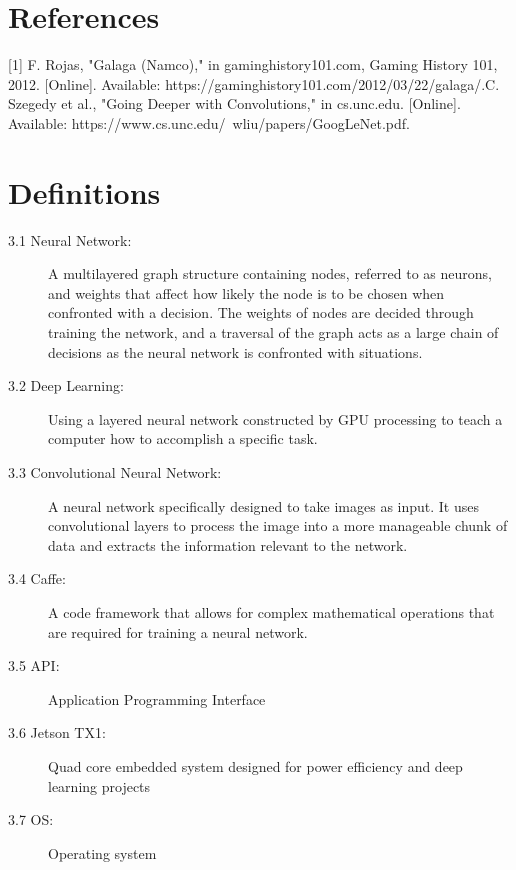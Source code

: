 \documentclass{scrreprt}
\begin{document}
\chapter{References}

[1] F. Rojas, "Galaga (Namco)," in gaminghistory101.com, Gaming History 101, 2012. [Online]. Available: https://gaminghistory101.com/2012/03/22/galaga/.\newline
[2] C. Szegedy et al., "Going Deeper with Convolutions," in cs.unc.edu. [Online]. Available: https://www.cs.unc.edu/~wliu/papers/GoogLeNet.pdf.\newline

\chapter{Definitions}
\begin{description}

  \item[3.1 Neural Network:] A multilayered graph structure containing nodes, referred to as neurons, and weights that affect how likely the node is to be chosen when confronted with a decision.
The weights of nodes are decided through training the network, and a traversal of the graph acts as a large chain of decisions as the neural network is confronted with situations.

  \item[3.2 Deep Learning:]  Using a layered neural network constructed by GPU processing to teach a computer how to accomplish a specific task.

  \item[3.3 Convolutional Neural Network:] A neural network specifically designed to take images as input.
It uses convolutional layers to process the image into a more manageable chunk of data and extracts the information relevant to the network.

  \item[3.4 Caffe:] A code framework that allows for complex mathematical operations that are required for training a neural network.

  \item[3.5 API:] Application Programming Interface

  \item[3.6 Jetson TX1:] Quad core embedded system designed for power efficiency and deep learning projects

  \item[3.7 OS:] Operating system


\end{description}
\end{document}
